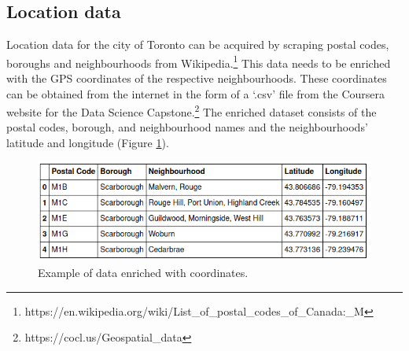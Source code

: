 \documentclass{article}
\begin{document}
\subsection{Location data}
Location data for the city of Toronto can be acquired by scraping postal codes, boroughs and neighbourhoods from Wikipedia.\footnote{https://en.wikipedia.org/wiki/List\_of\_postal\_codes\_of\_Canada:\_M} This data needs to be  enriched with the GPS coordinates of the respective neighbourhoods. These coordinates can be obtained from the internet in the form of a `.csv' file from the Coursera website for the Data Science Capstone.\footnote{https://cocl.us/Geospatial\_data} The enriched dataset consists of the postal codes, borough, and neighbourhood names and the neighbourhoods' latitude and longitude (Figure \ref{fig:enriched}).
\begin{figure}[ht]
 \includegraphics[width=\textwidth]{pics/enriched.png}
 \caption{Example of data enriched with coordinates.}
 \label{fig:enriched}
\end{figure}
\end{document}
